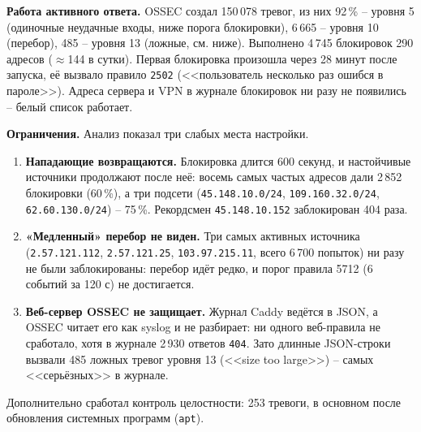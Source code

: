 \textbf{Работа активного ответа.} OSSEC создал 150\,078 тревог, из них
92\,\% -- уровня 5 (одиночные неудачные входы, ниже порога блокировки),
6\,665 -- уровня 10 (перебор), 485 -- уровня 13 (ложные, см. ниже).
Выполнено 4\,745 блокировок 290 адресов ($\approx$144 в сутки). Первая
блокировка произошла через 28 минут после запуска, её вызвало правило
\texttt{2502} (<<пользователь несколько раз ошибся в пароле>>).
Адреса сервера и VPN в журнале блокировок ни разу не появились -- белый
список работает.



\textbf{Ограничения.} Анализ показал три слабых места настройки.
\begin{enumerate}
  \item \textbf{Нападающие возвращаются.} Блокировка длится 600 секунд, и
  настойчивые источники продолжают после неё: восемь самых частых
  адресов дали 2\,852 блокировки (60\,\%), а три подсети
  (\texttt{45.148.10.0/24}, \texttt{109.160.32.0/24},
  \texttt{62.60.130.0/24}) -- 75\,\%. Рекордсмен \texttt{45.148.10.152}
  заблокирован 404 раза.
  \item \textbf{«Медленный» перебор не виден.} Три самых активных
  источника (\texttt{2.57.121.112}, \texttt{2.57.121.25},
  \texttt{103.97.215.11}, всего 6\,700 попыток) ни разу не были
  заблокированы: перебор идёт редко, и порог правила 5712 (6 событий за
  120 с) не достигается.
  \item \textbf{Веб-сервер OSSEC не защищает.} Журнал Caddy ведётся в
  JSON, а OSSEC читает его как syslog и не разбирает: ни одного
  веб-правила не сработало, хотя в журнале 2\,930 ответов \texttt{404}.
  Зато длинные JSON-строки вызвали 485 ложных тревог уровня 13 (<<size too
  large>>) -- самых <<серьёзных>> в журнале.
\end{enumerate}

Дополнительно сработал контроль целостности: 253 тревоги, в основном после
обновления системных программ (\texttt{apt}).


